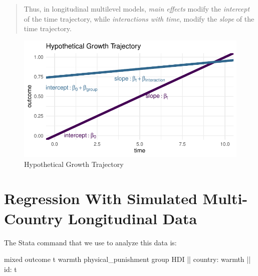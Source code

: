 \documentclass[
  letterpaper,
  DIV=11,
  numbers=noendperiod]{scrreprt}
\newenvironment{Shaded}{\begin{snugshade}}{\end{snugshade}}
\newcommand{\FunctionTok}[1]{\textcolor[rgb]{0.28,0.35,0.67}{#1}}
\newcommand{\NormalTok}[1]{\textcolor[rgb]{0.00,0.23,0.31}{#1}}
\begin{document}
\begin{quote}
Thus, in longitudinal multilevel models, \emph{main effects} modify the
\emph{intercept} of the time trajectory, while \emph{interactions with
time}, modify the \emph{slope} of the time trajectory.
\end{quote}

\begin{figure}

{\centering \includegraphics{longitudinal_files/figure-pdf/fig-trajectory-1.pdf}

}

\caption{\label{fig-trajectory}Hypothetical Growth Trajectory}

\end{figure}

\hypertarget{sec-regressionlongitudinal}{%
\section{Regression With Simulated Multi-Country Longitudinal
Data}\label{sec-regressionlongitudinal}}

The Stata command that we use to analyze this data is:

\begin{Shaded}
\begin{Highlighting}[]

\NormalTok{mixed outcome t warmth physical\_punishment }\FunctionTok{group}\NormalTok{ HDI || country: warmth || id: t}
\end{Highlighting}
\end{Shaded}
\end{document}
